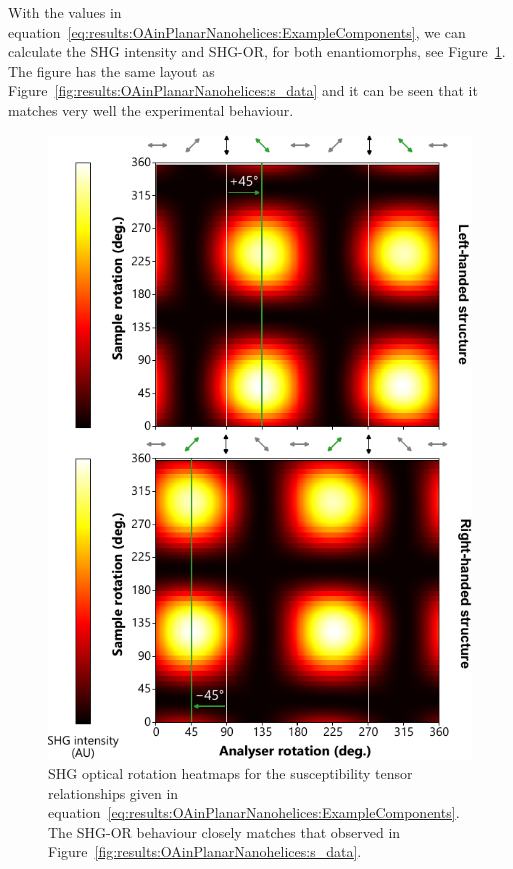 With the values in equation~\ref{eq:results:OAinPlanarNanohelices:ExampleComponents}, we can calculate the SHG intensity and SHG-OR, for both enantiomorphs, see Figure~\ref{fig:results:OAinPlanarNanohelices:sim_data}. 
The figure has the same layout as Figure~\ref{fig:results:OAinPlanarNanohelices:s_data} and it can be seen that it matches very well the experimental behaviour. 
\begin{figure}[htb!]	
    \centering	
    \includegraphics[scale=1]{./figures/results/OAinPlanarNanohelices/sim_data.pdf}

    \caption{\label{fig:results:OAinPlanarNanohelices:sim_data}
    SHG optical rotation heatmaps for the susceptibility tensor relationships given in equation~\ref{eq:results:OAinPlanarNanohelices:ExampleComponents}. The SHG-OR behaviour closely matches that observed in Figure~\ref{fig:results:OAinPlanarNanohelices:s_data}.}
\end{figure}


